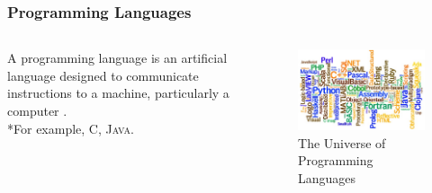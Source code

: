 \documentclass[aspectratio=1610]{beamer}
\begin{document}
\begin{frame}
\frametitle{Programming Languages}
  \begin{columns}[T]
    \begin{column}{.4\textwidth}
     \begin{block}{}
A programming language is an artificial language designed to communicate instructions to a machine, particularly a computer \cite{proglangwiki}.
\\*For example, \textsc{C, Java}.
    \end{block}
    \end{column}
    \begin{column}{.6\textwidth}
    \begin{block}{}
\begin{figure}
    \includegraphics[width=1.1\textwidth]{progLanguages.jpg}
    
    \caption{The Universe of Programming Languages \cite{proglanguniv}}
 \end{figure}   
    \end{block}
    \end{column}
  \end{columns}
\end{frame}

\end{document}
